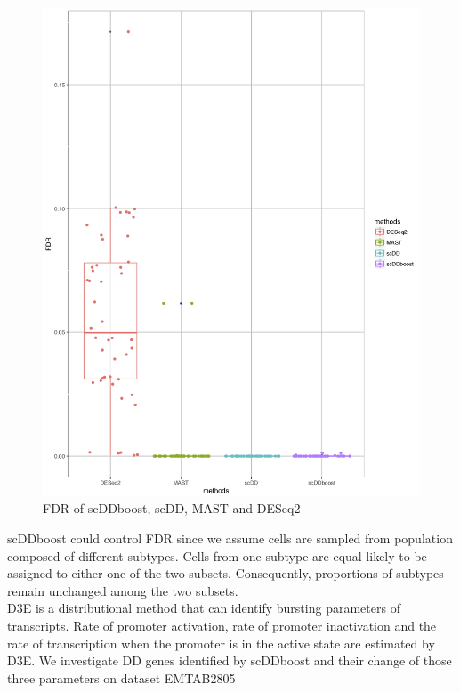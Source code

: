 \documentclass[11pt]{amsart}
\begin{document}
\begin{figure}[H]
\includegraphics[scale = 0.3]{FDR.png}
 \caption{FDR of scDDboost, scDD, MAST and DESeq2}
  \label{fig:6}
\end{figure}
scDDboost could control FDR since we assume cells are sampled from population composed of different subtypes. Cells from one subtype are equal likely to be assigned to either one of the two subsets. Consequently, proportions of subtypes remain unchanged among the two subsets.\\
D3E\cite{ref:d3e} is a distributional method that can identify bursting parameters of transcripts. Rate of promoter activation, rate of promoter inactivation and the rate of transcription when the promoter is in the active state are estimated by D3E.  We investigate DD genes identified by scDDboost and their change of those three parameters on dataset EMTAB2805\\
\end{document}
